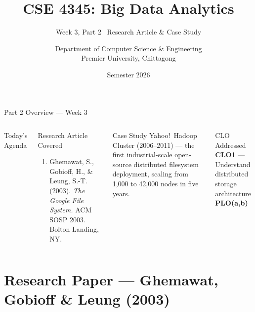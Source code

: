 \documentclass[aspectratio=169,10pt]{beamer}
\title[CSE 4345 \textbar{} Week 3, Part 2]{CSE 4345: Big Data Analytics}
\subtitle{Week 3, Part 2 \textemdash\ Research Article \& Case Study}
\author[Dept.\ of CSE]{Department of Computer Science \& Engineering\\[4pt]
       \small Premier University, Chittagong}
\institute{}
\date{Semester 2026}
\begin{document}

\begin{frame}
  \titlepage
\end{frame}

\begin{frame}{Part 2 Overview — Week 3}
  \begin{columns}[T]
      \begin{block}{Today's Agenda}
        \tableofcontents
      \end{block}

      \begin{exampleblock}{Research Article Covered}
        \begin{enumerate}
          \item Ghemawat, S., Gobioff, H., \& Leung, S.-T. (2003).
                \textit{The Google File System.}
                ACM SOSP 2003. Bolton Landing, NY.
        \end{enumerate}
      \end{exampleblock}
      \vspace{6pt}
      \begin{alertblock}{Case Study}
        Yahoo!\ Hadoop Cluster (2006--2011) — the first industrial-scale
        open-source distributed filesystem deployment,
        scaling from 1{,}000 to 42{,}000 nodes in five years.
      \end{alertblock}
      \vspace{4pt}
      \begin{block}{CLO Addressed}
        \textbf{CLO1} — Understand distributed storage architecture\\
        \textbf{PLO(a,b)}
      \end{block}
  \end{columns}
\end{frame}

\section{Research Paper — Ghemawat, Gobioff \& Leung (2003)}
\end{document}
